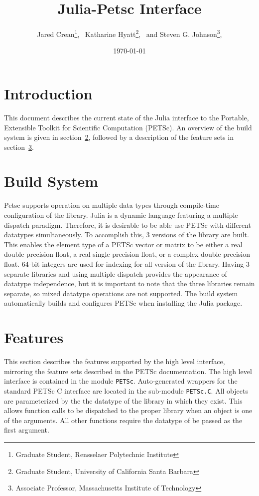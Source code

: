\documentclass{article}
\title{Julia-Petsc Interface}
\author{
  Jared Crean\thanks{Graduate Student, Rensselaer Polytechnic Institute}, \
  Katharine Hyatt\thanks{Graduate Student, University of California Santa Barbara}, \ and
  Steven G. Johnson\thanks{Associate Professor, Massachusetts Institute of Technology},
}
\date{\today}
\newcommand{\ttt}{\texttt}
\begin{document}
\maketitle

\section{Introduction} \label{sec:intro}
This document describes the current state of the Julia interface to the Portable, Extensible Toolkit for Scientific Computation (PETSc).  An overview of the build system is given in section~\ref{sec:build}, followed by a description of the  feature sets in section~\ref{sec:features}.

\section{Build System} \label{sec:build}
Petsc supports operation on multiple data types through compile-time configuration of the library.
Julia is a dynamic language featuring a multiple dispatch paradigm.
Therefore, it is desirable to be able use PETSc with different datatypes simultaneously. 
To accomplish this, 3 versions of the library are built.
This enables the element type of a PETSc vector or matrix to be either  a real double precision float, a real single precision float, or a complex double precision float.
64-bit integers are used for indexing for all version of the library.
Having 3 separate libraries and using multiple dispatch provides the appearance of datatype independence, but it is important to note that the three libraries remain separate, so mixed datatype operations are not supported.
The build system automatically builds and configures PETSc when installing the Julia package.


\section{Features} \label{sec:features}
This section describes the features supported by the high level interface, mirroring the feature sets described in the PETSc documentation.
The high level interface is contained in the  module \ttt{PETSc}.
Auto-generated wrappers for the standard PETSc C interface are located in the sub-module \ttt{PETSc.C}.
All objects are parameterized by the the datatype of the library in which they exist.
This allows function calls to be dispatched to the proper library when an object is one of the arguments.
All other functions require the datatype of be passed as the first argument.
\end{document}
